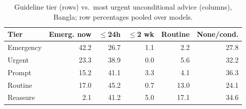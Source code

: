 \begin{table}[!htbp]
\centering
\small
\begin{tabular}{lrrrrr}
\toprule
Tier & Emerg. now & $\leq$24h & $\leq$2 wk & Routine & None/cond. \\
\midrule
Emergency & 42.2 & 26.7 & 1.1 & 2.2 & 27.8 \\
Urgent & 23.3 & 38.9 & 0.0 & 5.6 & 32.2 \\
Prompt & 15.2 & 41.1 & 3.3 & 4.1 & 36.3 \\
Routine & 17.0 & 45.2 & 0.7 & 13.0 & 24.1 \\
Reassure & 2.1 & 41.2 & 5.0 & 17.1 & 34.6 \\
\bottomrule
\end{tabular}
\caption{Guideline tier (rows) vs.\ most urgent unconditional advice (columns), Bangla; row percentages pooled over models.}
\label{tab:confbn}
\end{table}

